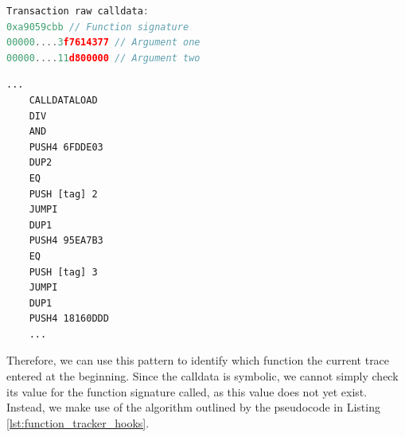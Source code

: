 \noindent\begin{minipage}{.45\textwidth}
\begin{lstlisting}[language=Javascript, caption={Transaction calldata}, label={lst:function_tracker_transaction_data}, basicstyle=\ttfamily\scriptsize]
Transaction raw calldata:
0xa9059cbb // Function signature
00000....3f7614377 // Argument one
00000....11d800000 // Argument two
\end{lstlisting}
\end{minipage}\hfill
\begin{minipage}{.45\textwidth}
  \begin{lstlisting}[language=EVM, caption={EVM dispatcher routine}, label={lst:function_tracker_dispatcher}, basicstyle=\ttfamily\scriptsize]
    ...
    CALLDATALOAD
    DIV
    AND
    PUSH4 6FDDE03
    DUP2
    EQ
    PUSH [tag] 2
    JUMPI
    DUP1
    PUSH4 95EA7B3
    EQ
    PUSH [tag] 3
    JUMPI
    DUP1
    PUSH4 18160DDD
    ...
  \end{lstlisting}
\end{minipage}

Therefore, we can use this pattern to identify which function the current trace entered
at the beginning. Since the calldata is symbolic, we cannot simply check its value for 
the function signature called, as this value does not yet exist. Instead, we make use of the
algorithm outlined by the pseudocode in Listing \ref{lst:function_tracker_hooks}.


